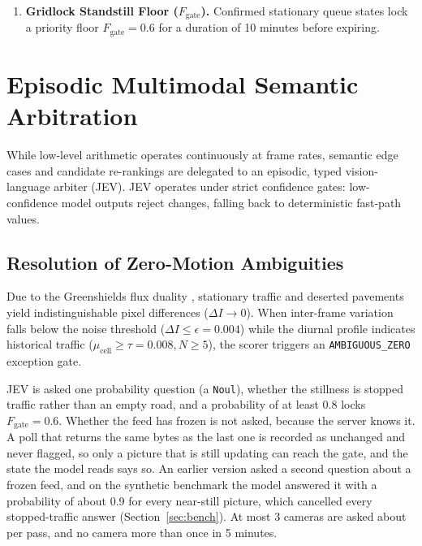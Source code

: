\documentclass[10pt,journal,compsoc]{IEEEtran}
\begin{document}
\begin{enumerate}
    where $F_{\text{anchor}}$ is the anchor incident floor, $s = 0.6$ is an unobserved inference discount, $M_{\max} = 5{,}000\text{ m}$ defines the spatial horizon, $\Delta M$ is topological distance upstream, and $\tau_{ij} = \frac{\Delta M}{v_{\text{wave}}}$ computes queue arrival time under a backward shockwave velocity $v_{\text{wave}} = 15\text{ km/h}$ \cite{lighthill1955, richards1956}. An arrived queue floor reaches the hold threshold only within about 2.2 km of a road-relevant record and about 3.1 km of a closure, so queue cameras farther upstream stay in the lower band.
    
    \item \textbf{Gridlock Standstill Floor ($F_{\text{gate}}$).} Confirmed stationary queue states lock a priority floor $F_{\text{gate}} = 0.6$ for a duration of 10 minutes before expiring.
\end{enumerate}

\section{Episodic Multimodal Semantic Arbitration}
While low-level arithmetic operates continuously at frame rates, semantic edge cases and candidate re-rankings are delegated to an episodic, typed vision-language arbiter (JEV). JEV operates under strict confidence gates: low-confidence model outputs reject changes, falling back to deterministic fast-path values.

\subsection{Resolution of Zero-Motion Ambiguities}
Due to the Greenshields flux duality \cite{greenshields1935}, stationary traffic and deserted pavements yield indistinguishable pixel differences ($\Delta I \to 0$). When inter-frame variation falls below the noise threshold ($\Delta I \le \epsilon = 0.004$) while the diurnal profile indicates historical traffic ($\mu_{\text{cell}} \ge \tau = 0.008, N \ge 5$), the scorer triggers an \texttt{AMBIGUOUS\_ZERO} exception gate.

JEV is asked one probability question (a \texttt{Noul}), whether the stillness is stopped traffic rather than an empty road, and a probability of at least 0.8 locks $F_{\text{gate}} = 0.6$. Whether the feed has frozen is not asked, because the server knows it. A poll that returns the same bytes as the last one is recorded as unchanged and never flagged, so only a picture that is still updating can reach the gate, and the state the model reads says so. An earlier version asked a second question about a frozen feed, and on the synthetic benchmark the model answered it with a probability of about 0.9 for every near-still picture, which cancelled every stopped-traffic answer (Section~\ref{sec:bench}). At most 3 cameras are asked about per pass, and no camera more than once in 5 minutes.
\end{document}

